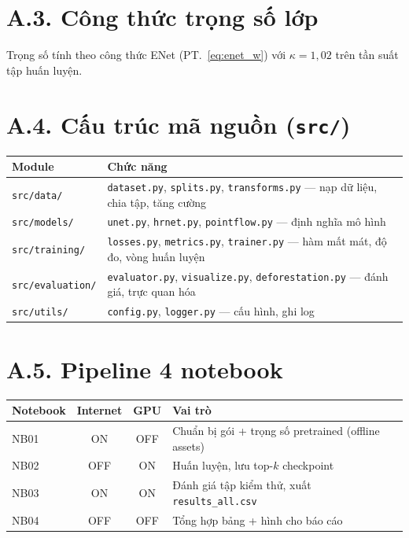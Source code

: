 \section*{A.3. Công thức trọng số lớp}
Trọng số tính theo công thức ENet (PT.~\ref{eq:enet_w}) với $\kappa = 1{,}02$ trên
tần suất tập huấn luyện.

\section*{A.4. Cấu trúc mã nguồn (\texttt{src/})}
\begin{center}
\small
\begin{tabular}{l l}
\toprule
\textbf{Module} & \textbf{Chức năng} \\
\midrule
\texttt{src/data/}       & \texttt{dataset.py}, \texttt{splits.py}, \texttt{transforms.py} --- nạp dữ liệu, chia tập, tăng cường \\
\texttt{src/models/}     & \texttt{unet.py}, \texttt{hrnet.py}, \texttt{pointflow.py} --- định nghĩa mô hình \\
\texttt{src/training/}   & \texttt{losses.py}, \texttt{metrics.py}, \texttt{trainer.py} --- hàm mất mát, độ đo, vòng huấn luyện \\
\texttt{src/evaluation/} & \texttt{evaluator.py}, \texttt{visualize.py}, \texttt{deforestation.py} --- đánh giá, trực quan hóa \\
\texttt{src/utils/}      & \texttt{config.py}, \texttt{logger.py} --- cấu hình, ghi log \\
\bottomrule
\end{tabular}
\end{center}

\section*{A.5. Pipeline 4 notebook}
\begin{center}
\small
\begin{tabular}{l c c l}
\toprule
\textbf{Notebook} & \textbf{Internet} & \textbf{GPU} & \textbf{Vai trò} \\
\midrule
NB01 & ON  & OFF & Chuẩn bị gói + trọng số pretrained (offline assets) \\
NB02 & OFF & ON  & Huấn luyện, lưu top-$k$ checkpoint \\
NB03 & ON  & ON  & Đánh giá tập kiểm thử, xuất \texttt{results\_all.csv} \\
NB04 & OFF & OFF & Tổng hợp bảng + hình cho báo cáo \\
\bottomrule
\end{tabular}
\end{center}

